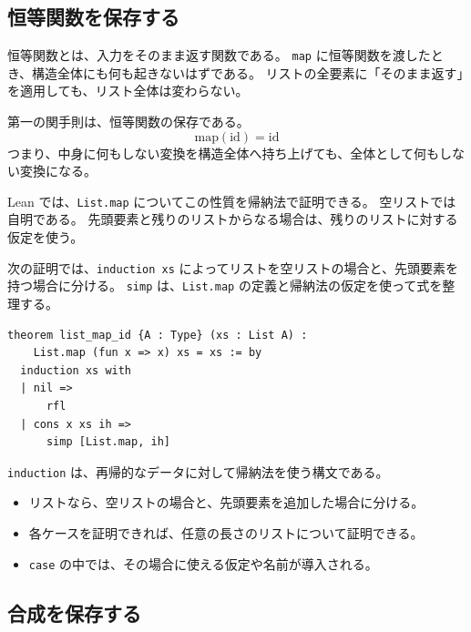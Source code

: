 \subsection{恒等関数を保存する}

恒等関数とは、入力をそのまま返す関数である。
\texttt{map} に恒等関数を渡したとき、構造全体にも何も起きないはずである。
リストの全要素に「そのまま返す」を適用しても、リスト全体は変わらない。

\begin{definitionbox}
第一の関手則は、恒等関数の保存である。
\[
  \mathrm{map}(\mathrm{id}) = \mathrm{id}
\]
つまり、中身に何もしない変換を構造全体へ持ち上げても、全体として何もしない変換になる。
\end{definitionbox}

Lean では、\texttt{List.map} についてこの性質を帰納法で証明できる。
空リストでは自明である。
先頭要素と残りのリストからなる場合は、残りのリストに対する仮定を使う。

\begin{leanbox}
次の証明では、\texttt{induction xs} によってリストを空リストの場合と、先頭要素を持つ場合に分ける。
\texttt{simp} は、\texttt{List.map} の定義と帰納法の仮定を使って式を整理する。
\end{leanbox}

\begin{listing}[htbp]
\begin{verbatim}
theorem list_map_id {A : Type} (xs : List A) :
    List.map (fun x => x) xs = xs := by
  induction xs with
  | nil =>
      rfl
  | cons x xs ih =>
      simp [List.map, ih]
\end{verbatim}
\caption{List.map は恒等関数を保存する}
\label{lst:ch08_list_map_id}
\end{listing}

\begin{syntaxbox}
\texttt{induction} は、再帰的なデータに対して帰納法を使う構文である。
\begin{itemize}
\item リストなら、空リストの場合と、先頭要素を追加した場合に分ける。
\item 各ケースを証明できれば、任意の長さのリストについて証明できる。
\item \texttt{case} の中では、その場合に使える仮定や名前が導入される。
\end{itemize}
\end{syntaxbox}


\subsection{合成を保存する}

